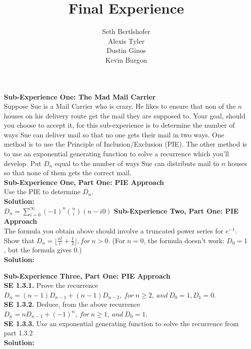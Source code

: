 \documentclass[10pt,a4paper]{report}
\author{Seth Bertlshofer\\Alexis Tyler\\Dustin Ginos\\Kevin Burgon}
\title{Final Experience}
\begin{document}
	\maketitle
	\textbf{Sub-Experience One: The Mad Mail Carrier}\\
	Suppose Sue is a Mail Carrier who is crazy.  He likes to ensure that non of the $n$ houses on his delivery route get the mail they are supposed to.  Your goal, should you choose to accept it, for this sub-experience is to determine the number of ways Sue can deliver mail so that no one gets their mail in two ways.  One method is to use the Principle of Inclusion/Exclusion (PIE).  The other method is to use an exponential generating function to solve a recurrence which you'll develop.  Put $D_n$ equal to the number of ways Sue can distribute mail to $n$ houses so that none of them gets the correct mail.\\
	
	\textbf{Sub-Experience One, Part One: PIE Approach}\\
	Use the PIE to determine $D_n$.\\
	
	\textbf{Solution: }\\
	\newline
	$D_n = \sum_{i=0}^{\infty} (-1)^n\binom{n}{i}(n-i0)$
	\textbf{Sub-Experience Two, Part One: PIE Approach}\\
	The formula you obtain above should involve a truncated power series for $e^{-1}$.  Show that $D_n = \lfloor\frac{n!}{e}+\frac{1}{2}\rfloor, for\ n > 0$. (For $n=0$, the formula doesn't work: $D_0 = 1$, but the formula gives 0.)\\
	\newline
	\textbf{Solution: }\\
	\newline


	\textbf{Sub-Experience Three, Part One: PIE Approach}\\
	\newline
	\textbf{SE 1.3.1.} Prove the recurrence $D_n = (n-1)D_{n-1} + (n-1)D_{n-2},\ for\ n\geq 2,\ and\ D_0 = 1, D_1=0$.\\
	\textbf{SE 1.3.2.} Deduce, from the above recurrence $D_n = nD_{n-1}+(-1)^n,\ for\ n\geq 1,\ and\ D_0 = 1$.\\
	\textbf{SE 1.3.3.} Use an exponential generating function to solve the recurrence from part 1.3.2\\
	\newline
	\textbf{Solution: }\\
	\newline
	
\end{document}
